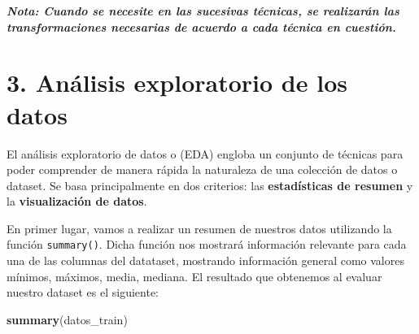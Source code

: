 \documentclass[spanish,]{article}
\newenvironment{Shaded}{\begin{snugshade}}{\end{snugshade}}
\newcommand{\KeywordTok}[1]{\textcolor[rgb]{0.13,0.29,0.53}{\textbf{#1}}}
\newcommand{\NormalTok}[1]{#1}
\begin{document}
\textbf{\emph{Nota: Cuando se necesite en las sucesivas técnicas, se
realizarán las transformaciones necesarias de acuerdo a cada técnica en
cuestión.}}

\newpage

\section{3. Análisis exploratorio de los
datos}\label{analisis-exploratorio-de-los-datos}

El análisis exploratorio de datos o (EDA) engloba un conjunto de
técnicas para poder comprender de manera rápida la naturaleza de una
colección de datos o dataset. Se basa principalmente en dos criterios:
las \textbf{estadísticas de resumen} y la \textbf{visualización de
datos}.

En primer lugar, vamos a realizar un resumen de nuestros datos
utilizando la función \texttt{summary()}. Dicha función nos mostrará
información relevante para cada una de las columnas del datataset,
mostrando información general como valores mínimos, máximos, media,
mediana. El resultado que obtenemos al evaluar nuestro dataset es el
siguiente:

\begin{Shaded}
\begin{Highlighting}[]
\KeywordTok{summary}\NormalTok{(datos_train)}
\end{Highlighting}
\end{Shaded}
\end{document}
